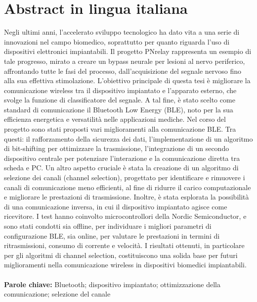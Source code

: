 \documentclass{Configuration_Files/PoliMi3i_thesis}
\begin{document}
\chapter*{Abstract in lingua italiana}
Negli ultimi anni, l’accelerato sviluppo tecnologico ha dato vita a una serie di innovazioni nel campo biomedico, soprattutto per quanto riguarda l'uso di dispositivi elettronici impiantabili. Il progetto PNrelay rappresenta un esempio di tale progresso, mirato a creare un bypass neurale per lesioni al nervo periferico, affrontando tutte le fasi del processo, dall'acquisizione del segnale nervoso fino alla sua effettiva stimolazione. L’obiettivo principale di questa tesi è migliorare la comunicazione wireless tra il dispositivo impiantato e l'apparato esterno, che svolge la funzione di classificatore del segnale. A tal fine, è stato scelto come standard di comunicazione il Bluetooth Low Energy (BLE), noto per la sua efficienza energetica e versatilità nelle applicazioni mediche.
Nel corso del progetto sono stati proposti vari miglioramenti alla comunicazione BLE. Tra questi: il rafforzamento della sicurezza dei dati, l’implementazione di un algoritmo di bit-shifting per ottimizzare la trasmissione, l'integrazione di un secondo dispositivo centrale per potenziare l'interazione e la comunicazione diretta tra scheda e PC. Un altro aspetto cruciale è stata la creazione di un algoritmo di selezione dei canali (channel selection), progettato per identificare e rimuovere i canali di comunicazione meno efficienti, al fine di ridurre il carico computazionale e migliorare le prestazioni di trasmissione.
Inoltre, è stata esplorata la possibilità di una comunicazione inversa, in cui il dispositivo impiantato agisce come ricevitore. I test hanno coinvolto microcontrollori della Nordic Semiconductor, e sono stati condotti sia offline, per individuare i migliori parametri di configurazione BLE, sia online, per valutare le prestazioni in termini di ritrasmissioni, consumo di corrente e velocità. I risultati ottenuti, in particolare per gli algoritmi di channel selection, costituiscono una solida base per futuri miglioramenti nella comunicazione wireless in dispositivi biomedici impiantabili.
\\
\\
\textbf{Parole chiave:} Bluetooth; dispositivo impiantato; ottimizzazione della comunicazione; selezione del canale
\end{document}
